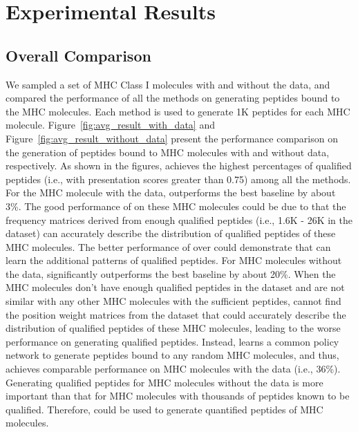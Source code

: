 \documentclass[letterpaper]{article}
\begin{document}
\section{Experimental Results}
\label{sec:results}

\subsection{Overall Comparison}
\label{sec:results:without}

We sampled a set of MHC Class I molecules with and without the data, and compared the performance of all the methods on generating
peptides bound to the MHC molecules.
%
Each method is used to generate 1K peptides for each MHC molecule.
%
Figure~\ref{fig:avg_result_with_data} and Figure~\ref{fig:avg_result_without_data} present the performance 
comparison on the generation of peptides bound to MHC molecules with and without data, respectively.
%
As shown in the figures, \pepppo achieves the highest percentages of qualified peptides (i.e., with presentation scores greater than 0.75)
among all the methods.
%
For the MHC molecule with the data, \pepppo outperforms the best baseline \pwm by about 3\%.
%
The good performance of \pwm on these MHC molecules could be due to that the frequency matrices derived from enough qualified peptides 
(i.e., 1.6K - 26K in the dataset) can accurately describe the distribution of qualified peptides of these MHC molecules.
%
The better performance of \pepppo over \pwm could demonstrate that \pepppo can learn the additional patterns of qualified 
peptides.
%
For MHC molecules without the data, \pepppo significantly outperforms the best baseline \pwm by about 20\%.
%
When the MHC molecules don't have enough qualified peptides in the dataset and are not similar with any other MHC molecules with the sufficient peptides, 
\pwm cannot find the position weight matrices from the dataset that could accurately describe the distribution of qualified peptides of these MHC molecules,
leading to the worse performance on generating qualified peptides.
%
Instead, \pepppo learns a common policy network to generate peptides bound to any random MHC molecules, and thus, achieves comparable performance 
on MHC molecules with the data (i.e., 36\%).
%
Generating qualified peptides for MHC molecules without the data is more important than that for MHC molecules with thousands of 
peptides known to be qualified.
%
Therefore, \pepppo could be used to generate quantified peptides of MHC molecules.
\end{document}
